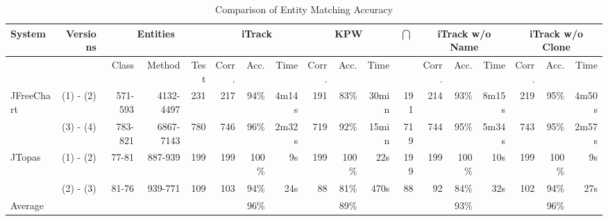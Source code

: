 \begin{table*}[htbp]
  \centering
  \caption{Comparison of Entity Matching Accuracy}


\setlength{\tabcolsep}{4pt}
\begin{tabular}{lr|rrr|rrr|rrr|r|rrr|rrr}
\addlinespace
\toprule
System & Versions & \multicolumn{3}{c|}{Entities} & \multicolumn{3}{c|}{iTrack} & \multicolumn{3}{c|}{KPW} & \multicolumn{1}{c|}{$\bigcap$} & \multicolumn{3}{c|}{iTrack w/o Name} & \multicolumn{3}{c}{iTrack w/o Clone} \\
\midrule
      &       & Class & Method & Test  & Corr. & Acc.  & Time  & Corr. & Acc.  & Time  &       & Corr. & Acc.  & Time  & Corr. & Acc.  & Time \\
JFreeChart & (1) - (2) & 571-593 & 4132-4497 & 231   & 217   & 94\%  & 4m14s & 191   & 83\%  & 30min & 191   & 214   & 93\%  & 8m15s & 219   & 95\%  & 4m50s \\
      & (3) - (4) & 783-821 & 6867-7143 & 780   & 746   & 96\%  & 2m32s & 719   & 92\%  & 15min & 719   & 744   & 95\%  & 5m34s & 743   & 95\%  & 2m57s \\
JTopas & (1) - (2) & 77-81 & 887-939 & 199   & 199   & 100\% & 9s    & 199   & 100\% & 22s   & 199   & 199   & 100\% & 10s   & 199   & 100\% & 9s \\
      & (2) - (3) & 81-76 & 939-771 & 109   & 103   & 94\%  & 24s   & 88    & 81\%  & 470s  & 88    & 92    & 84\%  & 32s   & 102   & 94\%  & 27s \\
\midrule
Average &       &       &       &       &       & 96\%  &       &       & 89\%  &       &       &       & 93\%  &       &       & 96\%  &  \\
\bottomrule
\end{tabular}%
  \label{tab:compare}%
\end{table*}%

